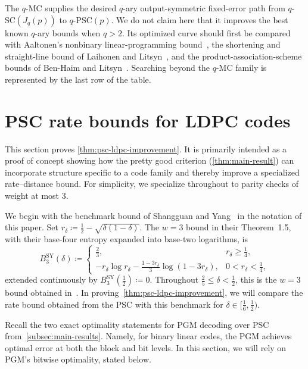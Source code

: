 \documentclass[11pt]{article}
\renewcommand{\leq}{\leqslant}
\renewcommand{\geq}{\geqslant}
\theoremstyle{remark}
\begin{document}
The $q$-MC supplies the desired $q$-ary output-symmetric fixed-error path from $q$-SC$(J_q(p))$ to $q$-PSC$(p)$. We do not claim here that it improves the best known $q$-ary bounds when $q > 2$. Its optimized curve should first be compared with Aaltonen's nonbinary linear-programming bound~\cite{Aal90}, the shortening and straight-line bound of Laihonen and Litsyn~\cite{LL98}, and the product-association-scheme bounds of Ben-Haim and Litsyn~\cite{BHL07}. Searching beyond the $q$-MC family is represented by the last row of the table.

\section{PSC rate bounds for LDPC codes}
\label{sec:psc-ldpc}

This section proves \cref{thm:psc-ldpc-improvement}. It is primarily intended as a proof of concept showing how the pretty good criterion (\cref{thm:main-result}) can incorporate structure specific to a code family and thereby improve a specialized rate--distance bound. For simplicity, we specialize throughout to parity checks of weight at most $3$.

We begin with the benchmark bound of Shangguan and Yang~\cite{SY26} in the notation of this paper. Set $r_\delta \coloneqq \frac{1}{2}-\sqrt{\delta(1-\delta)}$. The $w = 3$ bound in their Theorem~1.5, with their base-four entropy expanded into base-two logarithms, is 
\begin{equation}
\label{eq:sy-ldpc-base}
B_3^{\mathrm{SY}}(\delta)
\coloneqq
\begin{cases}
\frac{2}{3}, & r_\delta \geq \frac{1}{4}, \\
-r_\delta\log{r_\delta}
-\frac{1-3r_\delta}{3}\log(1-3r_\delta),
& 0 < r_\delta < \frac{1}{4},
\end{cases}
\end{equation}
extended continuously by $B_3^{\mathrm{SY}}(\frac{1}{2}) \coloneqq 0$. Throughout $\frac{2}{5} \leq \delta < \frac{1}{2}$, this is the $w = 3$ bound obtained in~\cite{SY26}. In proving~\cref{thm:psc-ldpc-improvement}, we will compare the rate bound obtained from the PSC with this benchmark for $\delta \in [\frac{1}{6},\frac{1}{2})$.

Recall the two exact optimality statements for PGM decoding over PSC from~\cref{subsec:main-results}. Namely, for binary linear codes, the PGM achieves optimal error at both the block and bit levels. In this section, we will rely on PGM's bitwise optimality, stated below.
\end{document}
